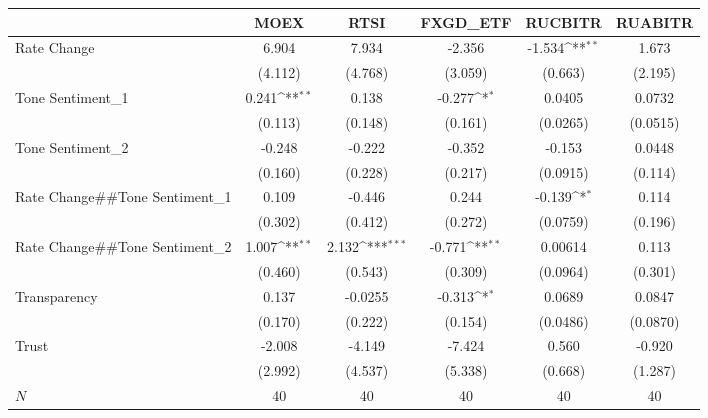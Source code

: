 {
\def\sym#1{\ifmmode^{#1}\else\(^{#1}\)\fi}
\begin{tabular}{l*{5}{c}}
\hline\hline
            &\multicolumn{1}{c}{MOEX}&\multicolumn{1}{c}{RTSI}&\multicolumn{1}{c}{FXGD\_ETF}&\multicolumn{1}{c}{RUCBITR}&\multicolumn{1}{c}{RUABITR}\\
\hline
Rate Change &       6.904         &       7.934         &      -2.356         &      -1.534\sym{**} &       1.673         \\
            &     (4.112)         &     (4.768)         &     (3.059)         &     (0.663)         &     (2.195)         \\
[1em]
Tone Sentiment\_{1}&       0.241\sym{**} &       0.138         &      -0.277\sym{*}  &      0.0405         &      0.0732         \\
            &     (0.113)         &     (0.148)         &     (0.161)         &    (0.0265)         &    (0.0515)         \\
[1em]
Tone Sentiment\_{2}&      -0.248         &      -0.222         &      -0.352         &      -0.153         &      0.0448         \\
            &     (0.160)         &     (0.228)         &     (0.217)         &    (0.0915)         &     (0.114)         \\
[1em]
Rate Change##Tone Sentiment\_{1}&       0.109         &      -0.446         &       0.244         &      -0.139\sym{*}  &       0.114         \\
            &     (0.302)         &     (0.412)         &     (0.272)         &    (0.0759)         &     (0.196)         \\
[1em]
Rate Change##Tone Sentiment\_{2}&       1.007\sym{**} &       2.132\sym{***}&      -0.771\sym{**} &     0.00614         &       0.113         \\
            &     (0.460)         &     (0.543)         &     (0.309)         &    (0.0964)         &     (0.301)         \\
[1em]
Transparency&       0.137         &     -0.0255         &      -0.313\sym{*}  &      0.0689         &      0.0847         \\
            &     (0.170)         &     (0.222)         &     (0.154)         &    (0.0486)         &    (0.0870)         \\
[1em]
Trust       &      -2.008         &      -4.149         &      -7.424         &       0.560         &      -0.920         \\
            &     (2.992)         &     (4.537)         &     (5.338)         &     (0.668)         &     (1.287)         \\
\hline
\(N\)       &          40         &          40         &          40         &          40         &          40         \\
\hline\hline
\end{tabular}
}
